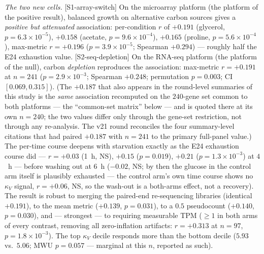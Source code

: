 \documentclass[11pt,a4paper]{article}
\theoremstyle{plain}
\theoremstyle{definition}
\theoremstyle{remark}
\begin{document}
\emph{The two new cells.} [S1-array-switch] On the microarray
platform (the platform of the positive result), balanced growth on
alternative carbon sources gives a \emph{positive but attenuated}
association: per-condition $r$ of $+0.191$ (glycerol,
$p = 6.3 \times 10^{-5}$), $+0.158$ (acetate,
$p = 9.6 \times 10^{-4}$), $+0.165$ (proline,
$p = 5.6 \times 10^{-4}$), max-metric $r = +0.196$
($p = 3.9 \times 10^{-5}$; Spearman $+0.294$) --- roughly half the
E24 exhaustion value. [S2-seq-depletion] On the RNA-seq platform
(the platform of the null), carbon \emph{depletion} reproduces the
association: max-metric $r = +0.191$ at $n = 241$
($p = 2.9 \times 10^{-3}$; Spearman $+0.248$; permutation
$p = 0.003$; CI $[0.069, 0.315]$). (The $+0.187$ that also appears
in the round-level summaries of this study is the \emph{same}
association recomputed on the $240$-gene set common to both platforms
--- the ``common-set matrix'' below --- and is quoted there at its
own $n = 240$; the two values differ only through the gene-set
restriction, not through any re-analysis. The v21 round reconciles
the four summary-level citations that had paired $+0.187$ with
$n = 241$ to the primary full-panel value.) The per-time course deepens with
starvation exactly as the E24 exhaustion course did --- $r =
+0.03$ (1~h, NS), $+0.15$ ($p = 0.019$), $+0.21$ ($p = 1.3 \times
10^{-3}$) at $4$~h --- before washing out at $6$~h ($-0.02$, NS;
by then the glucose in the control arm itself is plausibly
exhausted --- the control arm's own time course shows no $\kappa_V$
signal, $r = +0.06$, NS, so the wash-out is a both-arms effect,
not a recovery). The result is robust to merging the paired-end
re-sequencing libraries (identical $+0.191$), to the mean metric
($+0.139$, $p = 0.031$), to a $0.5$ pseudocount ($+0.140$,
$p = 0.030$), and --- strongest --- to requiring measurable TPM
($\geq 1$ in both arms of every contrast, removing all
zero-inflation artifacts: $r = +0.313$ at $n = 97$,
$p = 1.8 \times 10^{-3}$). The top $\kappa_V$ decile responds more
than the bottom decile ($5.93$ vs.\ $5.06$; MWU $p = 0.057$ ---
marginal at this $n$, reported as such).
\end{document}
